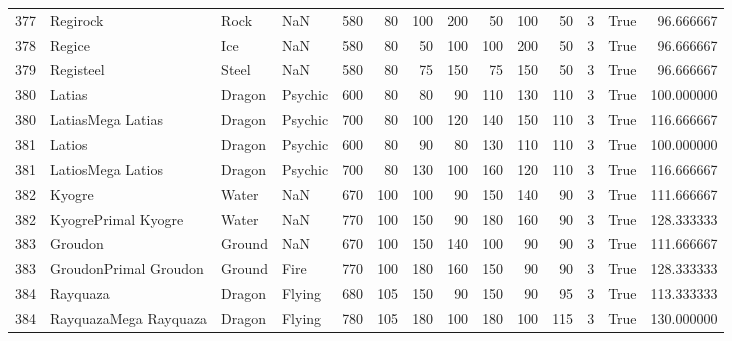 \begin{tabular}{rlllrrrrrrrrlr}
 377 &                   Regirock &      Rock &       NaN &    580 &   80 &     100 &      200 &       50 &      100 &     50 &           3 &       True &   96.666667 \\
 378 &                     Regice &       Ice &       NaN &    580 &   80 &      50 &      100 &      100 &      200 &     50 &           3 &       True &   96.666667 \\
 379 &                  Registeel &     Steel &       NaN &    580 &   80 &      75 &      150 &       75 &      150 &     50 &           3 &       True &   96.666667 \\
 380 &                     Latias &    Dragon &   Psychic &    600 &   80 &      80 &       90 &      110 &      130 &    110 &           3 &       True &  100.000000 \\
 380 &          LatiasMega Latias &    Dragon &   Psychic &    700 &   80 &     100 &      120 &      140 &      150 &    110 &           3 &       True &  116.666667 \\
 381 &                     Latios &    Dragon &   Psychic &    600 &   80 &      90 &       80 &      130 &      110 &    110 &           3 &       True &  100.000000 \\
 381 &          LatiosMega Latios &    Dragon &   Psychic &    700 &   80 &     130 &      100 &      160 &      120 &    110 &           3 &       True &  116.666667 \\
 382 &                     Kyogre &     Water &       NaN &    670 &  100 &     100 &       90 &      150 &      140 &     90 &           3 &       True &  111.666667 \\
 382 &        KyogrePrimal Kyogre &     Water &       NaN &    770 &  100 &     150 &       90 &      180 &      160 &     90 &           3 &       True &  128.333333 \\
 383 &                    Groudon &    Ground &       NaN &    670 &  100 &     150 &      140 &      100 &       90 &     90 &           3 &       True &  111.666667 \\
 383 &      GroudonPrimal Groudon &    Ground &      Fire &    770 &  100 &     180 &      160 &      150 &       90 &     90 &           3 &       True &  128.333333 \\
 384 &                   Rayquaza &    Dragon &    Flying &    680 &  105 &     150 &       90 &      150 &       90 &     95 &           3 &       True &  113.333333 \\
 384 &      RayquazaMega Rayquaza &    Dragon &    Flying &    780 &  105 &     180 &      100 &      180 &      100 &    115 &           3 &       True &  130.000000 \\

\end{tabular}
